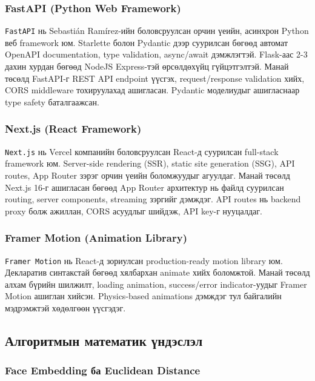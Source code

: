\documentclass[12pt,a4paper]{article}
\begin{document}
\subsubsection{FastAPI (Python Web Framework)}

\texttt{FastAPI} нь Sebastián Ramírez-ийн боловсруулсан орчин үеийн, асинхрон Python веб framework юм. Starlette болон Pydantic дээр суурилсан бөгөөд автомат OpenAPI documentation, type validation, async/await дэмжлэгтэй. Flask-аас 2-3 дахин хурдан бөгөөд NodeJS Express-тэй өрсөлдөхүйц гүйцэтгэлтэй. Манай төсөлд FastAPI-г REST API endpoint үүсгэх, request/response validation хийх, CORS middleware тохируулахад ашигласан. Pydantic моделиудыг ашигласнаар type safety баталгаажсан.

\subsubsection{Next.js (React Framework)}

\texttt{Next.js} нь Vercel компанийн боловсруулсан React-д суурилсан full-stack framework юм. Server-side rendering (SSR), static site generation (SSG), API routes, App Router зэрэг орчин үеийн боломжуудыг агуулдаг. Манай төсөлд Next.js 16-г ашигласан бөгөөд App Router архитектур нь файлд суурилсан routing, server components, streaming зэргийг дэмждэг. API routes нь backend proxy болж ажиллан, CORS асуудлыг шийдэж, API key-г нууцалдаг.

\subsubsection{Framer Motion (Animation Library)}

\texttt{Framer Motion} нь React-д зориулсан production-ready motion library юм. Декларатив синтакстай бөгөөд хялбархан animate хийх боломжтой. Манай төсөлд алхам бүрийн шилжилт, loading animation, success/error indicator-уудыг Framer Motion ашиглан хийсэн. Physics-based animations дэмждэг тул байгалийн мэдрэмжтэй хөдөлгөөн үүсгэдэг.

\subsection{Алгоритмын математик үндэслэл}

\subsubsection{Face Embedding ба Euclidean Distance}
\end{document}
